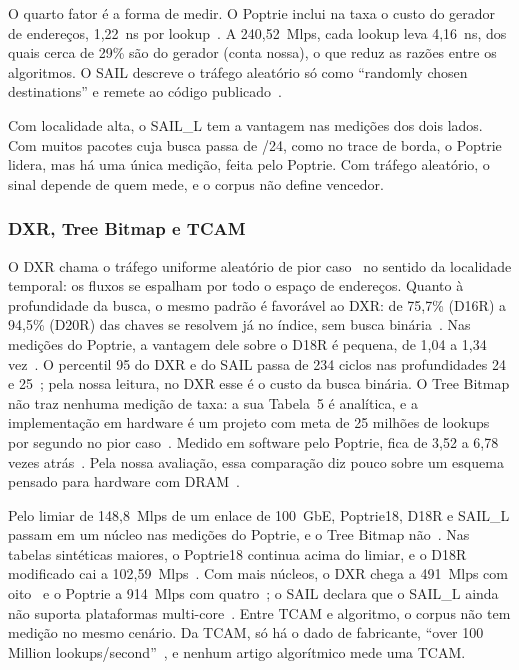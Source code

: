 \documentclass[conference,a4paper]{IEEEtran}
\begin{document}
O quarto fator é a forma de medir. O Poptrie inclui na taxa o custo do gerador de endereços, 1,22~ns por
lookup~\cite[\S4.2]{asai15}. A 240,52~Mlps, cada lookup leva 4,16~ns, dos quais cerca de 29\% são do gerador (conta
nossa), o que reduz as razões entre os algoritmos. O SAIL descreve o tráfego aleatório só como ``randomly chosen
destinations'' e remete ao código publicado~\cite[\S VI-A]{yang18}.

Com localidade alta, o SAIL\_L tem a vantagem nas medições dos dois lados. Com muitos pacotes cuja busca passa de /24, como no
trace de borda, o Poptrie lidera, mas há uma única medição, feita pelo Poptrie. Com tráfego aleatório, o sinal depende de
quem mede, e o corpus não define vencedor.

\subsubsection{DXR, Tree Bitmap e TCAM}
O DXR chama o tráfego uniforme aleatório de pior caso~\cite[\S4.1]{zec12} no sentido da localidade temporal: os fluxos se
espalham por todo o espaço de endereços. Quanto à profundidade da busca, o mesmo padrão é favorável ao DXR: de 75,7\% (D16R)
a 94,5\% (D20R) das chaves se resolvem já no índice, sem busca binária~\cite[Tab.~3]{zec12}. Nas medições do Poptrie, a
vantagem dele sobre o D18R é pequena, de 1,04 a 1,34 vez~\cite[\S4.5]{asai15}. O percentil 95 do DXR e do SAIL passa de 234
ciclos nas profundidades 24 e 25~\cite[\S4.6]{asai15}; pela nossa leitura, no DXR esse é o custo da busca binária.
O Tree Bitmap não traz nenhuma medição de taxa: a sua Tabela~5 é analítica, e a implementação em hardware é um projeto com
meta de 25 milhões de lookups por segundo no pior caso~\cite[\S7.2]{eath04}. Medido em software pelo Poptrie, fica de 3,52 a
6,78 vezes atrás~\cite[\S4.5]{asai15}. Pela nossa avaliação, essa comparação diz pouco sobre um esquema pensado para
hardware com DRAM~\cite[\S7]{eath04}.

Pelo limiar de 148,8~Mlps de um enlace de 100~GbE, Poptrie18, D18R e SAIL\_L passam em um núcleo nas medições do Poptrie,
e o Tree Bitmap não~\cite[Tab.~3]{asai15}. Nas tabelas sintéticas maiores, o Poptrie18 continua acima do limiar, e o D18R
modificado cai a 102,59~Mlps~\cite[\S4.8]{asai15}. Com mais núcleos, o DXR chega a 491~Mlps com oito~\cite[Tab.~2]{zec12} e
o Poptrie a 914~Mlps com quatro~\cite[\S1]{asai15}; o SAIL declara que o SAIL\_L ainda não suporta plataformas
multi-core~\cite[\S IV-E]{yang18}. Entre TCAM e algoritmo, o corpus não tem medição no mesmo cenário. Da TCAM, só há o dado
de fabricante, ``over 100 Million lookups/second''~\cite[\S II]{zane03}, e nenhum artigo algorítmico mede uma TCAM.
\end{document}
